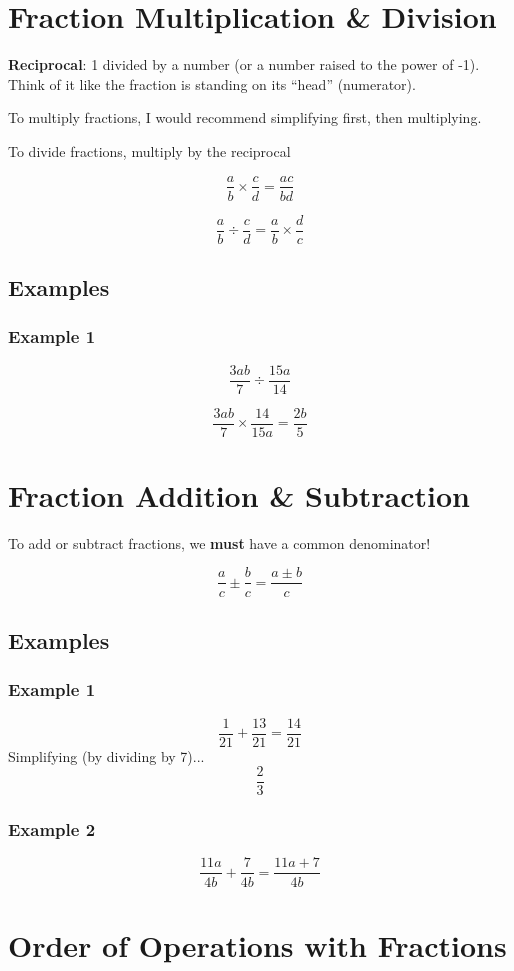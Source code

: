 \documentclass[letterpaper, 10pt]{article}
\begin{document}
\section{Fraction Multiplication \& Division}
\noindent \textbf{Reciprocal}: 1 divided by a number (or a number raised to the power of -1). Think of it like the fraction is standing on its ``head'' (numerator).


To multiply fractions, I would recommend simplifying first, then multiplying.

To divide fractions, multiply by the reciprocal

$$
\frac{a}{b} \times \frac{c}{d} = \frac{ac}{bd}
$$

$$
\frac{a}{b} \div \frac{c}{d} = \frac{a}{b} \times \frac{d}{c}
$$
\subsection{Examples}
\subsubsection{Example 1}
	$$
	\frac{3ab}{7} \div \frac{15a}{14}
	$$

	$$
	\frac{3ab}{7} \times \frac{14}{15a} = \frac{2b}{5}
	$$


\section{Fraction Addition \& Subtraction}
To add or subtract fractions, we \textbf{must} have a common denominator!

$$
\frac{a}{c} \pm \frac{b}{c} = \frac{a \pm b}{c}
$$

\subsection{Examples}
\subsubsection{Example 1}
$$
\frac{1}{21} + \frac{13}{21} = \frac{14}{21}
$$
Simplifying (by dividing by 7)...
$$
\frac{2}{3}
$$

\subsubsection{Example 2}
$$
\frac{11a}{4b} + \frac{7}{4b} = \frac{11a + 7}{4b}
$$

\section{Order of Operations with Fractions}
\end{document}
